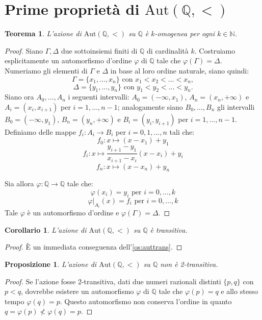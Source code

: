 \documentclass[12pt,a4paper,openright]{report}
\newcommand{\aut}{ \mathrm{Aut} ( \mathbb{Q},< ) } %
\newcommand{\Q}{\mathbb{Q}} %
\newcommand{\0}{\setminus\{0\}} %
\theoremstyle{definition}
\theoremstyle{plain}
\newtheorem{theo}[defn]{Teorema}
\newtheorem{cor}[defn]{Corollario}
\newtheorem{prop}[defn]{Proposizione}
\begin{document}
\section{Prime proprietà di $\aut$}

\begin{theo}\label{theo:k-omog}
L'azione di $\aut$ su $\Q$ è $k$-omogenea per ogni $k \in \mathbb{N}$.
\end{theo}
\begin{proof}
Siano $\Gamma,\Delta$ due sottoinsiemi finiti di $\Q$ di cardinalità $k$. Costruiamo esplicitamente un automorfismo d'ordine $\varphi$ di $\Q$ tale che $\varphi(\Gamma)=\Delta$. \\
Numeriamo gli elementi di $\Gamma$ e $\Delta$ in base al loro ordine naturale, siano quindi:
\[\Gamma=\{x_1,\ldots,x_n\} \mbox{ con } x_1<x_2<\ldots<x_n,\] 
\[\Delta=\{y_1,\ldots,y_n\} \mbox{ con } y_1<y_2<\ldots<y_n.\]
Siano ora $A_0,\ldots,A_n$ i seguenti intervalli: $A_0=(-\infty,x_1)$, $A_n=(x_n,+\infty)$ e $A_i=(x_i,x_{i+1})$ per $i=1,\ldots,n-1$; analogamente siano $B_0,\ldots,B_n$ gli intervalli $B_0=(-\infty,y_1)$, $B_n=(y_n,+\infty)$ e $B_i=(y_i,y_{i+1})$ per $i=1,\ldots,n-1$. \\
Definiamo delle mappe $f_i:A_i \rightarrow B_i$ per $i=0,1,\ldots,n$ tali che:
\[f_0:x \mapsto (x-x_1)+y_1\]
\[f_i:x \mapsto \frac{y_{i+1}-y_1}{x_{i+1}-x_i} (x-x_i)+y_i\]
\[f_n:x \mapsto (x-x_n)+y_n\]

Sia allora $\varphi:\Q \rightarrow \Q$ tale che:
\[\varphi(x_i)=y_i \mbox{ per } i=0,\ldots,k\]
\[\varphi|_{A_i}(x)=f_i \mbox{ per } i=0,\ldots,k\]
Tale $\varphi$ è un automorfismo d'ordine e $\varphi(\Gamma)=\Delta$.
\end{proof}
\begin{cor}
L'azione di $\aut$ su $\Q$ è transitiva.
\end{cor}
\begin{proof}
    È un immediata conseguenza dell'\cref{os:auttrans}.
\end{proof}
\begin{prop}
L'azione di $\aut$ su $\Q$ non è 2-transitiva.
\end{prop}
\begin{proof}
Se l'azione fosse 2-transitiva, dati due numeri razionali distinti $\{p,q\}$ con $p<q$, dovrebbe esistere un automorfismo $\varphi$ di $\Q$ tale che $\varphi(p)=q$ e allo stesso tempo $\varphi(q)=p$. Questo automorfismo non conserva l'ordine in quanto $q=\varphi(p)\nless \varphi(q)=p$.
\end{proof}
\end{document}
